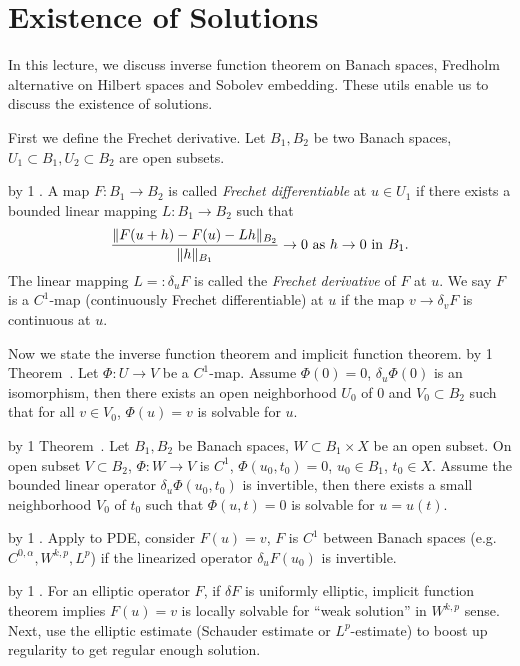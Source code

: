 \section{Existence of Solutions}

In this lecture, we discuss inverse function theorem on Banach spaces, Fredholm alternative on Hilbert spaces and Sobolev embedding.
These utils enable us to discuss the existence of solutions.

First we define the Frechet derivative.
Let $B_1,B_2$ be two Banach spaces, $U_1\subset B_1,U_2\subset B_2$ are open subsets.
\medskip

\advance\propcount by 1
.
A map $F:B_1\to B_2$ is called {\it Frechet differentiable} at $u\in U_1$ if there exists a bounded linear mapping $L:B_1\to B_2$ such that
$${\|F(u+h)-F(u)-Lh\|_{B_2}\over\|h\|_{B_1}}\to 0\ {\rm as}\ h\to 0\ {\rm in}\ B_1.$$
The linear mapping $L=:\delta_uF$ is called the {\it Frechet derivative} of $F$ at $u$.
We say $F$ is a $C^1$-map (continuously Frechet differentiable) at $u$ if the map $v\to\delta_vF$ is continuous at $u$.
\medskip

Now we state the inverse function theorem and implicit function theorem.
\advance\propcount by 1
\proclaim Theorem~\propnumber.
Let $\Phi:U\to V$ be a $C^1$-map.
Assume $\Phi(0)=0$, $\delta_u\Phi(0)$ is an isomorphism, then there exists an open neighborhood $U_0$ of $0$ and $V_0\subset B_2$ such that for all $v\in V_0$, $\Phi(u)=v$ is solvable for $u$.

\advance\propcount by 1
\proclaim Theorem~\propnumber.
Let $B_1,B_2$ be Banach spaces, $W\subset B_1\times X$ be an open subset.
On open subset $V\subset B_2$, $\Phi:W\to V$ is $C^1$, $\Phi(u_0,t_0)=0$, $u_0\in B_1$, $t_0\in X$.
Assume the bounded linear operator $\delta_u\Phi(u_0,t_0)$ is invertible, then there exists a small neighborhood $V_0$ of $t_0$ such that $\Phi(u,t)=0$ is solvable for $u=u(t)$.

\advance\propcount by 1
.
Apply to PDE, consider $F(u)=v$, $F$ is $C^1$ between Banach spaces (e.g.\ $C^{0,\alpha},W^{k,p},L^p$) if the linearized operator $\delta_uF(u_0)$ is invertible.
\medskip

\advance\propcount by 1
.
For an elliptic operator $F$, if $\delta F$ is uniformly elliptic, implicit function theorem implies $F(u)=v$ is locally solvable for ``weak solution'' in $W^{k,p}$ sense.
Next, use the elliptic estimate (Schauder estimate or $L^p$-estimate) to boost up regularity to get regular enough solution.
\medskip

